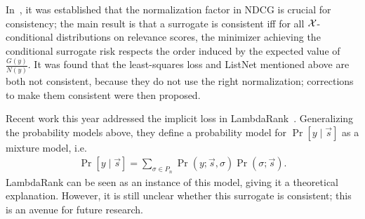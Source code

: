 In~\cite{ravikumar2011ndcg}, it was established that the normalization factor
in NDCG is crucial for consistency; the main result is that a surrogate is
consistent iff for all ${\mathcal X}$-conditional distributions on relevance scores,
the minimizer achieving the conditional surrogate risk
respects the order induced by the expected value of $\frac{G(y)}{N(y)}$.
It was found that the
least-squares loss and ListNet mentioned above are both not consistent, because
they do not use the right normalization; corrections to make them consistent
were then proposed.

Recent work this year addressed the implicit loss in
LambdaRank~\cite{wang2018lambdaloss}.
Generalizing the probability models above, they define a probability model for
$\Pr[y \mid \vec{s}]$ as a mixture model, i.e.\
\begin{align*}
  \Pr[y \mid \vec{s}] = \sum_{\sigma \in P_n} \Pr(y ; \vec{s}, \sigma) \Pr(\sigma ; \vec{s}).
\end{align*}
LambdaRank can be seen as an instance of this model, giving it a theoretical
explanation. 
However, it is still unclear whether this surrogate is consistent; this is an
avenue for future research. 
